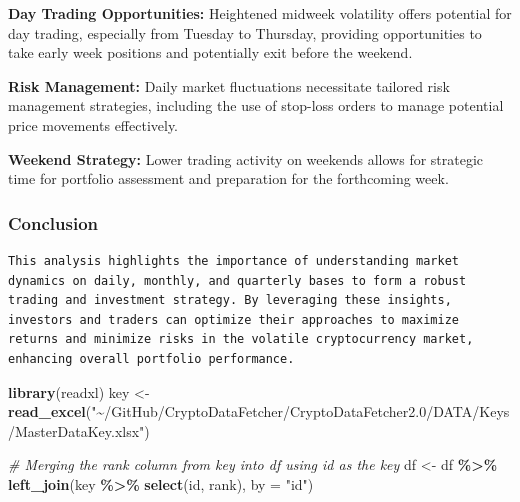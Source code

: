 \documentclass[
]{article}
\newenvironment{Shaded}{\begin{snugshade}}{\end{snugshade}}
\newcommand{\AttributeTok}[1]{\textcolor[rgb]{0.13,0.29,0.53}{#1}}
\newcommand{\CommentTok}[1]{\textcolor[rgb]{0.56,0.35,0.01}{\textit{#1}}}
\newcommand{\FunctionTok}[1]{\textcolor[rgb]{0.13,0.29,0.53}{\textbf{#1}}}
\newcommand{\NormalTok}[1]{#1}
\newcommand{\OtherTok}[1]{\textcolor[rgb]{0.56,0.35,0.01}{#1}}
\newcommand{\SpecialCharTok}[1]{\textcolor[rgb]{0.81,0.36,0.00}{\textbf{#1}}}
\newcommand{\StringTok}[1]{\textcolor[rgb]{0.31,0.60,0.02}{#1}}
\begin{document}
\textbf{Day Trading Opportunities:} Heightened midweek volatility offers
potential for day trading, especially from Tuesday to Thursday,
providing opportunities to take early week positions and potentially
exit before the weekend.

\textbf{Risk Management:} Daily market fluctuations necessitate tailored
risk management strategies, including the use of stop-loss orders to
manage potential price movements effectively.

\textbf{Weekend Strategy:} Lower trading activity on weekends allows for
strategic time for portfolio assessment and preparation for the
forthcoming week.

\hypertarget{conclusion}{%
\subsubsection{Conclusion}\label{conclusion}}

\begin{verbatim}
This analysis highlights the importance of understanding market dynamics on daily, monthly, and quarterly bases to form a robust trading and investment strategy. By leveraging these insights, investors and traders can optimize their approaches to maximize returns and minimize risks in the volatile cryptocurrency market, enhancing overall portfolio performance.
\end{verbatim}

\begin{Shaded}
\begin{Highlighting}[]
\FunctionTok{library}\NormalTok{(readxl)}
\NormalTok{key }\OtherTok{\textless{}{-}} \FunctionTok{read\_excel}\NormalTok{(}\StringTok{"\textasciitilde{}/GitHub/CryptoDataFetcher/CryptoDataFetcher2.0/DATA/Keys/MasterDataKey.xlsx"}\NormalTok{)}
\end{Highlighting}
\end{Shaded}

\begin{Shaded}
\begin{Highlighting}[]
\CommentTok{\# Merging the \textquotesingle{}rank\textquotesingle{} column from \textquotesingle{}key\textquotesingle{} into \textquotesingle{}df\textquotesingle{} using \textquotesingle{}id\textquotesingle{} as the key}
\NormalTok{df }\OtherTok{\textless{}{-}}\NormalTok{ df }\SpecialCharTok{\%\textgreater{}\%}
  \FunctionTok{left\_join}\NormalTok{(key }\SpecialCharTok{\%\textgreater{}\%} \FunctionTok{select}\NormalTok{(id, rank), }\AttributeTok{by =} \StringTok{"id"}\NormalTok{)}
\end{Highlighting}
\end{Shaded}
\end{document}
